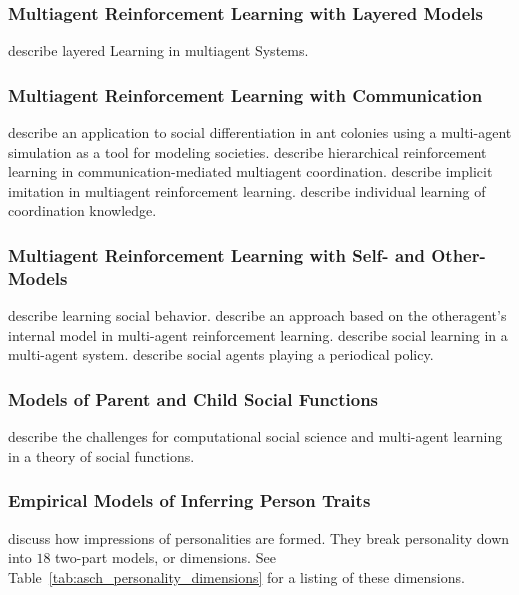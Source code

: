 \subsubsection{Multiagent Reinforcement Learning with Layered Models}
\cite{stone:1997} describe layered Learning in multiagent Systems.

\subsubsection{Multiagent Reinforcement Learning with Communication}

\cite{drogoul:1994} describe an application to social differentiation in ant colonies using a multi-agent simulation as a tool for modeling societies.
\cite{fischer:2004} describe hierarchical reinforcement learning in communication-mediated multiagent coordination.
\cite{price:1999} describe implicit imitation in multiagent reinforcement learning.
\cite{sen:1998} describe individual learning of coordination knowledge.

\subsubsection{Multiagent Reinforcement Learning with Self- and Other- Models}

\cite{mataric:1997b} describe learning social behavior.
\cite{nagayuki:2000} describe an approach based on the otheragent's internal model in multi-agent reinforcement learning.
\cite{noble:2004} describe social learning in a multi-agent system.
\cite{nowe:2001} describe social agents playing a periodical policy.

\subsubsection{Models of Parent and Child Social Functions}
\cite{castelfranchi:2001} describe the challenges for computational social science and multi-agent learning in a theory of social functions.


\subsubsection{Empirical Models of Inferring Person Traits}

\cite{asch:2005} discuss how impressions of personalities are formed.
They break personality down into $18$ two-part models, or dimensions.
See Table~\ref{tab:asch_personality_dimensions} for a listing of these dimensions.

